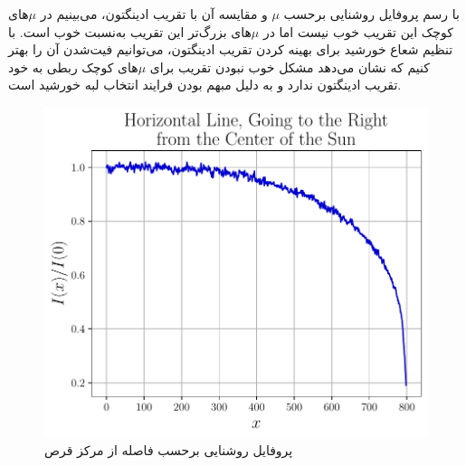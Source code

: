 \documentclass[12pt,a4paper]{article}
\begin{document}
	با رسم پروفایل روشنایی برحسب $\mu$ و مقایسه آن با تقریب ادینگتون، می‌بینیم در $\mu$های کوچک این تقریب خوب نیست اما
	در $\mu$های بزرگ‌تر این تقریب به‌نسبت خوب است. با تنظیم شعاع خورشید برای بهینه کردن تقریب ادینگتون، می‌توانیم فیت‌شدن
	آن را بهتر کنیم که نشان می‌دهد مشکل خوب نبودن تقریب برای $\mu$های کوچک ربطی به خود تقریب ادینگتون ندارد و به دلیل
	مبهم بودن فرایند انتخاب لبه خورشید است.
	\begin{figure}
		\centering
		\includegraphics[width=0.8\linewidth]{../fig/intensity}
		\caption{پروفایل روشنایی برحسب فاصله از مرکز قرص}
	\end{figure}
\end{document}
